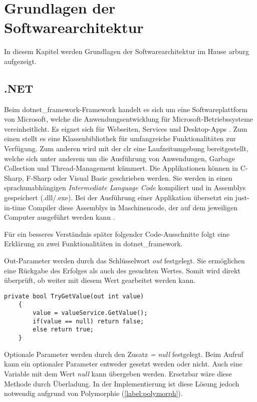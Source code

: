 \chapter{Grundlagen der Softwarearchitektur}
\label{chap:theo_softw_archit}
In diesem Kapitel werden Grundlagen der Softwarearchitektur im Hause \gls{arburg} aufgezeigt. 

\section{.NET}
\label{sec:dotnet}
Beim \gls{dotnet_framework}-Framework handelt es sich um eine Softwareplattform von Microsoft, welche die Anwendungsentwicklung für Microsoft-Betriebssysteme vereinheitlicht. Es eignet sich für Webseiten, Services und Desktop-Apps \cite{dotnetArchitecture}. Zum einen stellt es eine Klassenbibliothek für umfangreiche Funktionalitäten zur Verfügung. Zum anderen wird mit der \gls{clr} eine Laufzeitumgebung bereitgestellt, welche sich unter anderem um die Ausführung von Anwendungen, Garbage Collection und Thread-Management kümmert. Die Applikationen können in C-Sharp, F-Sharp oder Visual Basic geschrieben werden. Sie werden in einen sprachunabhängigen \textit{Intermediate Language Code} kompiliert und in Assemblys gespeichert (.dll/.exe). Bei der Ausführung einer Applikation übersetzt ein just-in-time Compiler diese Assemblys in Maschinencode, der auf dem jeweiligen Computer ausgeführt werden kann \cite{dotnetArchitecture}. 

Für ein besseres Verständnis später folgender Code-Ausschnitte folgt eine Erklärung zu zwei Funktionalitäten in \gls{dotnet_framework}.

Out-Parameter werden durch das Schlüsselwort \textit{out} festgelegt. Sie ermöglichen eine Rückgabe des Erfolges als auch des gesuchten Wertes. Somit wird direkt überprüft, ob weiter mit diesem Wert gearbeitet werden kann. 

\begin{lstlisting}[caption=Beispiel zu out-Parametern, label=lst:exa_out]
	private bool TryGetValue(out int value)
	{
		value = valueService.GetValue();
		if(value == null) return false;
		else return true;
	}
\end{lstlisting}

Optionale Parameter werden durch den Zusatz \textit{= null} festgelegt. Beim Aufruf kann ein optionaler Parameter entweder gesetzt werden oder nicht. Auch eine Variable mit dem Wert \textit{null} kann übergeben werden. Ersetzbar wäre diese Methode durch Überladung. In der Implementierung ist diese Lösung jedoch notwendig aufgrund von Polymorphie (\autoref{label:polymorph}). 

